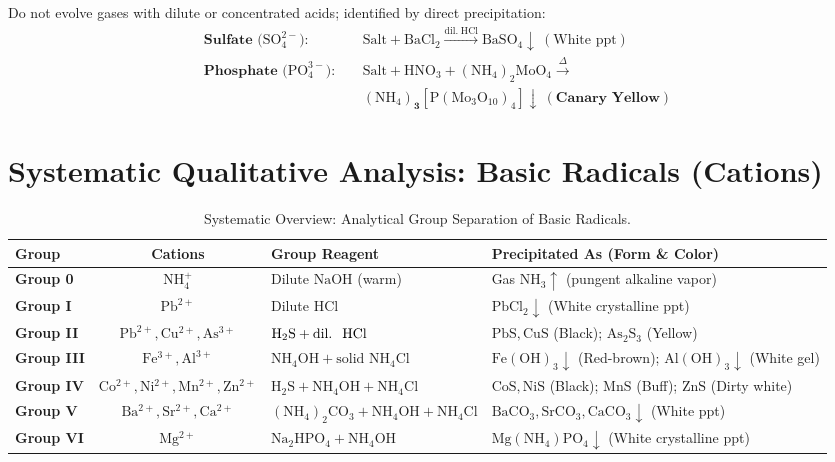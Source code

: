 \documentclass[10pt,twoside,openright]{book}
\begin{document}
\begin{formulabox}
Do not evolve gases with dilute or concentrated acids; identified by direct precipitation:
\begin{align*}
  \textbf{Sulfate } (\mathrm{SO_4^{2-}): } \quad & \text{Salt} + \mathrm{BaCl_2} \xrightarrow{\mathrm{dil.\; HCl}} \mathbf{\mathrm{BaSO_4} \downarrow} \ (\text{White ppt})\\
  \textbf{Phosphate } (\mathrm{PO_4^{3-}): } \quad & \text{Salt} + \mathrm{HNO_3} + (\mathrm{NH_4})_2\mathrm{MoO_4} \xrightarrow{\Delta} \\
  &\mathbf{(\mathrm{NH_4})_3[\mathrm{P(Mo_{3}O_{10})_4}] \downarrow} \ (\textbf{Canary Yellow})
\end{align*}
\end{formulabox}

\section{Systematic Qualitative Analysis: Basic Radicals (Cations)}

\begin{table}[htbp]
\centering
\scriptsize
\setlength{\tabcolsep}{2.5pt}
\renewcommand{\arraystretch}{1.15}
\begin{tabularx}{\linewidth}{l c L L}
\toprule
\textbf{Group} & \textbf{Cations} & \textbf{Group Reagent} & \textbf{Precipitated As (Form \& Color)} \\
\midrule
\textbf{Group 0} & $\mathrm{NH_4^+}$ & Dilute $\mathrm{NaOH}$ (warm) & Gas $\mathrm{NH_3} \uparrow$ (pungent alkaline vapor) \\
\textbf{Group I} & $\mathrm{Pb^{2+}}$ & Dilute $\mathrm{HCl}$ & $\mathrm{PbCl_2} \downarrow$ (White crystalline ppt) \\
\textbf{Group II} & $\mathrm{Pb^{2+}, Cu^{2+}, As^{3+}}$ & $\mathrm{H_2S} + \text{dil.\; } \mathrm{HCl}$ & $\mathrm{PbS, CuS}$ (Black); $\mathrm{As_2S_3}$ (Yellow) \\
\textbf{Group III} & $\mathrm{Fe^{3+}, Al^{3+}}$ & $\mathrm{NH_4OH} + \text{solid } \mathrm{NH_4Cl}$ & $\mathrm{Fe(OH)_3} \downarrow$ (Red-brown); $\mathrm{Al(OH)_3} \downarrow$ (White gel) \\
\textbf{Group IV} & $\mathrm{Co^{2+}, Ni^{2+}, Mn^{2+}, Zn^{2+}}$ & $\mathrm{H_2S} + \mathrm{NH_4OH} + \mathrm{NH_4Cl}$ & $\mathrm{CoS, NiS}$ (Black); $\mathrm{MnS}$ (Buff); $\mathrm{ZnS}$ (Dirty white) \\
\textbf{Group V} & $\mathrm{Ba^{2+}, Sr^{2+}, Ca^{2+}}$ & $(\mathrm{NH_4})_2\mathrm{CO_3} + \mathrm{NH_4OH} + \mathrm{NH_4Cl}$ & $\mathrm{BaCO_3, SrCO_3, CaCO_3} \downarrow$ (White ppt) \\
\textbf{Group VI} & $\mathrm{Mg^{2+}}$ & $\mathrm{Na_2HPO_4} + \mathrm{NH_4OH}$ & $\mathrm{Mg(NH_4)PO_4} \downarrow$ (White crystalline ppt) \\
\bottomrule
\end{tabularx}
\caption{Systematic Overview: Analytical Group Separation of Basic Radicals.}
\label{tab:cation_separation_overview}
\end{table}
\end{document}
